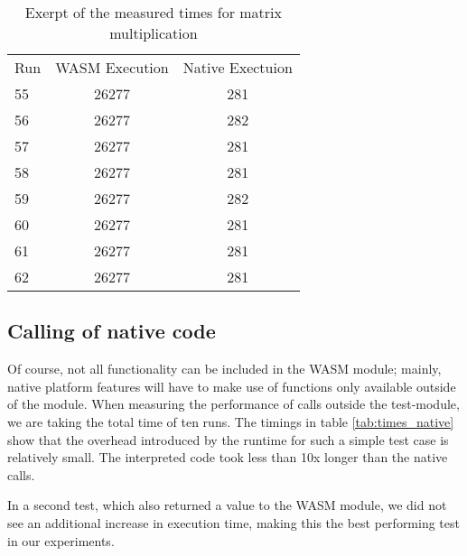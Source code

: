 \begin{table} [h]
    \begin{tabular}{l c c}
        Run & WASM Execution & Native Exectuion \\
        55  & 26277          & 281              \\
        56  & 26277          & 282              \\
        57  & 26277          & 281              \\
        58  & 26277          & 281              \\
        59  & 26277          & 282              \\
        60  & 26277          & 281              \\
        61  & 26277          & 281              \\
        62  & 26277          & 281              \\
    \end{tabular}
    \caption{Exerpt of the measured times for matrix multiplication}
    \label{tab:times_matrix}
\end{table}

\subsection{Calling of native code}

Of course, not all functionality can be included in the WASM module; mainly, native platform features will have to make use of functions only available outside of the module. When measuring the performance of calls outside the test-module, we are taking the total time of ten runs. The timings in table \ref{tab:times_native} show that the overhead introduced by the runtime for such a simple test case is relatively small. The interpreted code took less than 10x longer than the native calls.

In a second test, which also returned a value to the WASM module, we did not see an additional increase in execution time, making this the best performing test in our experiments.

